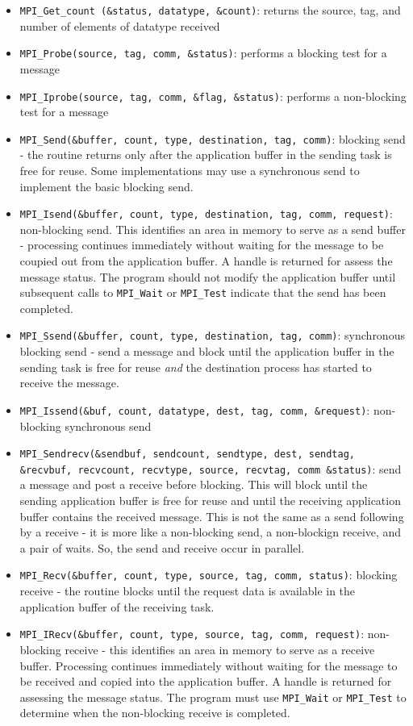 \documentclass[10pt]{article}
\begin{document}
\begin{flushleft}
\begin{itemize}
\item {\tt MPI\_Get\_count (\&status, datatype, \&count)}: returns the source, tag, and number of elements of datatype received
\item {\tt MPI\_Probe(source, tag, comm, \&status)}: performs a blocking test for a message
\item {\tt MPI\_Iprobe(source, tag, comm, \&flag, \&status)}: performs a non-blocking test for a message
\item {\tt MPI\_Send(\&buffer, count, type, destination, tag, comm)}: blocking send - the routine returns only after the application buffer in the sending task is free for reuse. Some implementations may use a synchronous send to implement the basic blocking send. 
\item {\tt MPI\_Isend(\&buffer, count, type, destination, tag, comm, request)}: non-blocking send. This identifies an area in memory to serve as a send buffer - processing continues immediately without waiting for the message to be coupied out from the application buffer. A handle is returned for assess the message status. The program should not modify the application buffer until subsequent calls to {\tt MPI\_Wait} or {\tt MPI\_Test} indicate that the send has been completed.
\item {\tt MPI\_Ssend(\&buffer, count, type, destination, tag, comm)}: synchronous blocking send - send a message and block until the application buffer in the sending task is free for reuse \textit{and} the destination process has started to receive the message. 
\item {\tt MPI\_Issend(\&buf, count, datatype, dest, tag, comm, \&request)}: non-blocking synchronous send
\item {\tt MPI\_Sendrecv(\&sendbuf, sendcount, sendtype, dest, sendtag, \&recvbuf, recvcount, recvtype, source, recvtag, comm \&status)}: send a message and post a receive before blocking. This will block until the sending application buffer is free for reuse and until the receiving application buffer contains the received message. This is not the same as a send following by a receive - it is more like a non-blocking send, a non-blockign receive, and a pair of waits. So, the send and receive occur in parallel. 
\item {\tt MPI\_Recv(\&buffer, count, type, source, tag, comm, status)}: blocking receive - the routine blocks until the request data is available in the application buffer of the receiving task. 
\item {\tt MPI\_IRecv(\&buffer, count, type, source, tag, comm, request)}: non-blocking receive - this identifies an area in memory to serve as a receive buffer. Processing continues immediately without waiting for the message to be received and copied into the application buffer. A handle is returned for assessing the message status. The program must use {\tt MPI\_Wait} or {\tt MPI\_Test} to determine when the non-blocking receive is completed. 

\end{itemize}
\end{flushleft}
\end{document}
